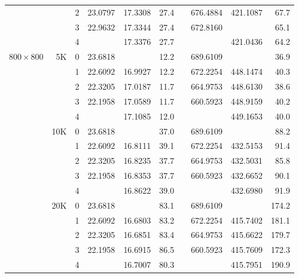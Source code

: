 \begin{table}[p!]
{\begin{tabular}{crrd{4}d{4}rld{4}d{4}r}
                &     & 2 &      23.0797  &      17.3308  & 27.4 &  &      676.4884  &      421.1087  &  67.7 \\
                &     & 3 &      22.9632  &      17.3344  & 27.4 &  &      672.8160  &  &  65.1 \\
                &     & 4 &  &      17.3376  & 27.7 &  &  &      421.0436  &  64.2 \\
\hline
$800\times 800$ &  5K & 0 &      23.6818  &  & 12.2 &  &      689.6109  &  &  36.9 \\
                &     & 1 &      22.6092  &      16.9927  & 12.2 &  &      672.2254  &      448.1474  &  40.3 \\
                &     & 2 &      22.3205  &      17.0187  & 11.7 &  &      664.9753  &      448.6130  &  38.6 \\
                &     & 3 &      22.1958  &      17.0589  & 11.7 &  &      660.5923  &      448.9159  &  40.2 \\
                &     & 4 &  &      17.1085  & 12.0 &  &  &      449.1653  &  40.0 \\
                & 10K & 0 &      23.6818  &  & 37.0 &  &      689.6109  &  &  88.2 \\
                &     & 1 &      22.6092  &      16.8111  & 39.1 &  &      672.2254  &      432.5153  &  91.4 \\
                &     & 2 &      22.3205  &      16.8235  & 37.7 &  &      664.9753  &      432.5031  &  85.8 \\
                &     & 3 &      22.1958  &      16.8353  & 37.7 &  &      660.5923  &      432.6652  &  90.1 \\
                &     & 4 &  &      16.8622  & 39.0 &  &  &      432.6980  &  91.9 \\
                & 20K & 0 &      23.6818  &  & 83.1 &  &      689.6109  &  & 174.2 \\
                &     & 1 &      22.6092  &      16.6803  & 83.2 &  &      672.2254  &      415.7402  & 181.1 \\
                &     & 2 &      22.3205  &      16.6851  & 83.4 &  &      664.9753  &      415.6622  & 179.7 \\
                &     & 3 &      22.1958  &      16.6915  & 86.5 &  &      660.5923  &      415.7609  & 172.3 \\
                &     & 4 &  &      16.7007  & 80.3 &  &  &      415.7951  & 190.9 \\
\hline
\end{tabular}}
\end{table}

